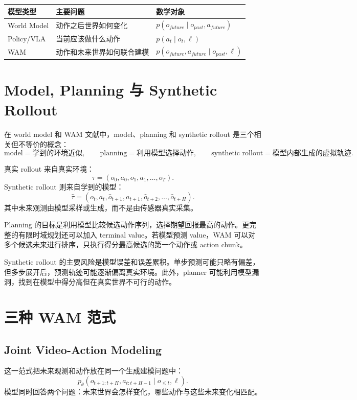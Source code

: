 \documentclass[11pt,a4paper]{ctexart}
\begin{document}
\begin{center}
\begin{tabular}{lll}
\toprule
模型类型 & 主要问题 & 数学对象 \\
\midrule
World Model & 动作之后世界如何变化 &
$p(o_{future}\mid o_{past},a_{future})$ \\
Policy/VLA & 当前应该做什么动作 &
$p(a_t\mid o_t,\ell)$ \\
WAM & 动作和未来世界如何联合建模 &
$p(o_{future},a_{future}\mid o_{past},\ell)$ \\
\bottomrule
\end{tabular}
\end{center}

\section{Model, Planning 与 Synthetic Rollout}

在 world model 和 WAM 文献中，model、planning 和 synthetic rollout 是三个相关但不等价的概念：
\[
  \text{model}=\text{学到的环境近似},
\qquad
  \text{planning}=\text{利用模型选择动作},
\qquad
  \text{synthetic rollout}=\text{模型内部生成的虚拟轨迹}.
\]

真实 rollout 来自真实环境：
\[
  \tau=(o_0,a_0,o_1,a_1,\ldots,o_T).
\]
Synthetic rollout 则来自学到的模型：
\[
  \hat{\tau}=(o_t,a_t,\hat{o}_{t+1},a_{t+1},\hat{o}_{t+2},\ldots,\hat{o}_{t+H}).
\]
其中未来观测由模型采样或生成，而不是由传感器真实采集。

Planning 的目标是利用模型比较候选动作序列，选择期望回报最高的动作。更完整的有限时域规划还可以加入 terminal value。若模型预测 value，WAM 可以对多个候选未来进行排序，只执行得分最高候选的第一个动作或 action chunk。

Synthetic rollout 的主要风险是模型误差和误差累积。单步预测可能只略有偏差，但多步展开后，预测轨迹可能逐渐偏离真实环境。此外，planner 可能利用模型漏洞，找到在模型中得分高但在真实世界不可行的动作。

\section{三种 WAM 范式}

\subsection{Joint Video-Action Modeling}

这一范式把未来观测和动作放在同一个生成建模问题中：
\[
  p_\theta(o_{t+1:t+H},a_{t:t+H-1}\mid o_{\le t},\ell).
\]
模型同时回答两个问题：未来世界会怎样变化，哪些动作与这些未来变化相匹配。
\end{document}
